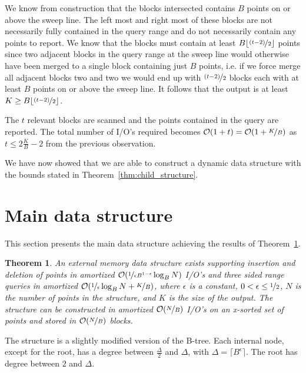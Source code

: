 \documentclass[twoside,11pt,openright]{report}
\newtheorem{theorem}{Theorem}
\begin{document}
We know from construction that the blocks intersected contains $B$ points on or above the sweep line. The left most and right most of these blocks are not necessarily fully contained in the query range and do not necessarily contain any points to report. We know that the blocks must contain at least $B\lfloor \nicefrac{(t-2)}{2}\rfloor$ points since two adjacent blocks in the query range at the sweep line would otherwise have been merged to a single block containing just $B$ points, i.e. if we force merge all adjacent blocks two and two we would end up with $\nicefrac{(t-2)}{2}$ blocks each with at least $B$ points on or above the sweep line. It follows that the output is at least $K \geq B\lfloor \nicefrac{(t-2)}{2}\rfloor$.

The $t$ relevant blocks are scanned and the points contained in the query are reported. The total number of I/O's required becomes $\mathcal{O}(1+t) = \mathcal{O}(1+\nicefrac{K}{B})$ as $t \leq 2\frac{K}{B}-2$ from the previous observation.

We have now showed that we are able to construct a dynamic data structure with the bounds stated in Theorem~\ref{thm:child_structure}.


\section{Main data structure}
\label{sec:main_data_structure}
This section presents the main data structure achieving the results of Theorem~\ref{thm:main_structure}.
\begin{theorem}
\label{thm:main_structure}
An external memory data structure exists supporting insertion and deletion of points in amortized $\mathcal{O}(\nicefrac{1}{\epsilon B^{1-\epsilon}} \log_B N)$ I/O's and three sided range queries in amortized $\mathcal{O}(\nicefrac{1}{\epsilon} \log_B N + \nicefrac{K}{B})$, where $\epsilon$ is a constant, $0 < \epsilon \leq \nicefrac{1}{2}$, $N$ is the number of points in the structure, and $K$ is the size of the output. The structure can be constructed in amortized $\mathcal{O}(\nicefrac{N}{B})$ I/O's on an x-sorted set of points and stored in $\mathcal{O}(\nicefrac{N}{B})$ blocks.
\end{theorem}

The structure is a slightly modified version of the B-tree. Each internal node, except for the root, has a degree between $\frac{\Delta}{2}$ and $\Delta$, with $\Delta = \lceil B^\epsilon \rceil$. The root has degree between $2$ and $\Delta$.
\end{document}
